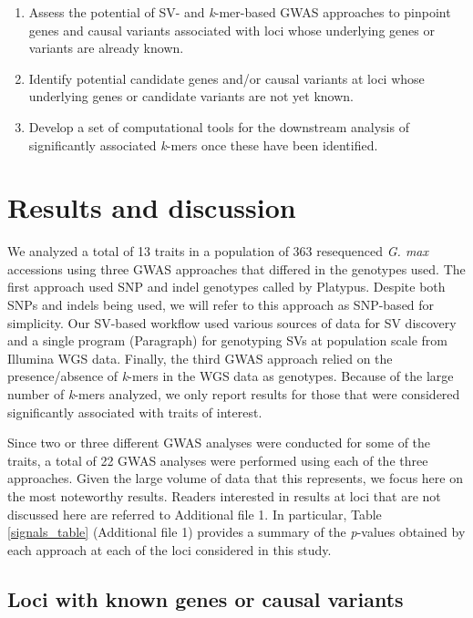 \begin{enumerate}
	\item Assess the potential of SV- and \emph{k}-mer-based GWAS approaches to
		pinpoint genes and causal variants associated with loci whose
		underlying genes or variants are already known.
	\item Identify potential candidate genes and/or causal variants at loci
		whose underlying genes or candidate variants are not yet known.
	\item Develop a set of computational tools for the downstream analysis
		of significantly associated \emph{k}-mers once these have been
		identified.
\end{enumerate}


\section*{Results and discussion}
\label{sv-gwas-results-discussion}

We analyzed a total of 13 traits in a population of 363 resequenced \textit{G.
max} accessions using three GWAS approaches that differed in the genotypes
used. The first approach used SNP and indel genotypes called by Platypus.
Despite both SNPs and indels being used, we will refer to this approach as
SNP-based for simplicity. Our SV-based workflow used various sources of data
for SV discovery and a single program (Paragraph) for genotyping SVs at
population scale from Illumina WGS data. Finally, the third GWAS approach
relied on the presence/absence of \textit{k}-mers in the WGS data as genotypes.
Because of the large number of \textit{k}-mers analyzed, we only report results
for those that were considered significantly associated with traits of
interest.

Since two or three different GWAS analyses were conducted for some of the
traits, a total of 22 GWAS analyses were performed using each of the three
approaches.  Given the large volume of data that this represents, we focus here
on the most noteworthy results. Readers interested in results at loci that are
not discussed here are referred to Additional file 1. In particular, Table
\ref{signals_table} (Additional file 1) provides a summary of the
\textit{p}-values obtained by each approach at each of the loci considered in
this study.

\subsection*{Loci with known genes or causal variants}
\label{sv-gwas-results-cloned-genes}

